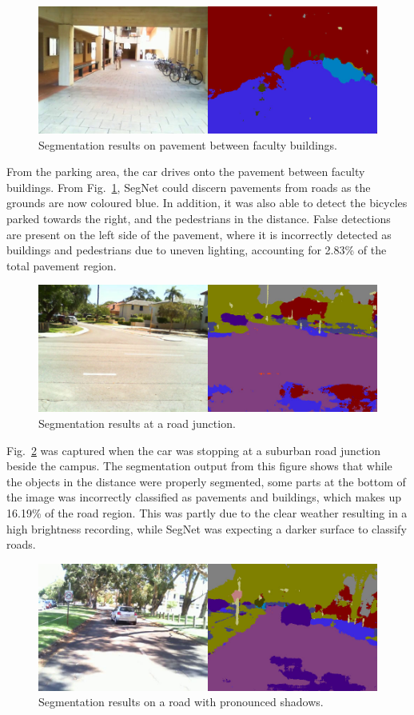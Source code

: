 \begin{figure}[H]
	\centering
	\includegraphics[width=0.8\linewidth]{3}
	\caption{Segmentation results on pavement between faculty buildings.}
	\label{fig:5:pavement}
\end{figure}

From the parking area, the car drives onto the pavement between faculty buildings. From Fig.~\ref{fig:5:pavement}, SegNet could discern pavements from roads as the grounds are now coloured blue. In addition, it was also able to detect the bicycles parked towards the right, and the pedestrians in the distance. False detections are present on the left side of the pavement, where it is incorrectly detected as buildings and pedestrians due to uneven lighting, accounting for 2.83\% of the total pavement region. 

\begin{figure}[H]
	\centering
	\includegraphics[width=0.8\linewidth]{4}
	\caption{Segmentation results at a road junction.}
	\label{fig:5:junction}
\end{figure}

Fig.~\ref{fig:5:junction} was captured when the car was stopping at a suburban road junction beside the campus. The segmentation output from this figure shows that while the objects in the distance were properly segmented, some parts at the bottom of the image was incorrectly classified as pavements and buildings, which makes up 16.19\% of the road region. This was partly due to the clear weather resulting in a high brightness recording, while SegNet was expecting a darker surface to classify roads. 

\begin{figure}[H]
	\centering
	\includegraphics[width=0.8\linewidth]{5}
	\caption{Segmentation results on a road with pronounced shadows.}
	\label{fig:5:shadows}
\end{figure}

